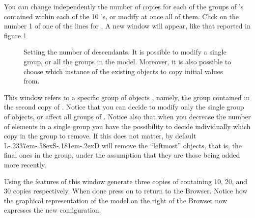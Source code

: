 \documentclass [11pt,a4paper] {book}
\def\LsD{{L\kern-.2337em\lower-.58ex\hbox{S}\kern-.181em\lower-.2ex\hbox{D}}\xspace}
\begin{document}
You can change independently the number of copies for
each of the groups of 's contained within each of the 10 's, or modify at
once all of them. Click on the number 1 of one of the lines for . A new window will appear, like that reported in figure \ref{fig:numobj}

\begin{figure}[ht]
  \centering
  \caption{Setting the number of descendants. It is possible to modify a single group, or all the groups in the model. Moreover, it is also possible to choose which instance of the existing objects to copy initial values from.}
  \label{fig:numobj}
\end{figure}

This window refers to a specific group of objects , namely, the group contained in the second copy of . Notice that you can decide to modify only the single group of objects, or affect all groups of . Notice also that when you decrease the number of elements in a single group you have the possibility to decide individually which copy in the group to remove. If this does not matter, by default \LsD will remove the ``leftmost'' objects, that is, the final ones in the group, under the assumption that they are those being added more recently.

Using the features of this window generate three copies of  containing 10, 20, and 30
copies respectively. When done press on  to return to the Browser. Notice how
the graphical representation of the model on the right of the Browser now expresses the
new configuration.
\end{document}
